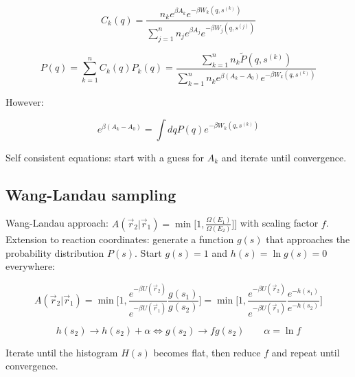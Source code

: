 	$$C_k(q) = \frac{n_ke^{\beta A_k}e^{-\beta W_k(q, s^{(k)})}}{\sum\limits_{j=1}^nn_je^{\beta A_j}e^{-\beta W_j(q, s^{(j)})}}$$

	$$P(q) = \sum\limits_{k=1}^nC_k(q)P_k(q) = \frac{\sum\limits_{k=1}^nn_k\tilde{P}(q, s^{(k)})}{\sum\limits_{k=1}^nn_ke^{\beta(A_k-A_0)}e^{-\beta W_k(q, s^{(k)})}}$$

	However:

	$$e^{\beta(A_k-A_0)} = \int dq P(q)e^{-\beta W_k(q, s^{(k)})}$$

	Self consistent equations: start with a guess for $A_k$ and iterate until convergence.

	\subsection{Wang-Landau sampling}
	Wang-Landau approach: $A(\vec{r}_2|\vec{r}_1) = \min\biggl[1, \frac{\Omega(E_1)}{\Omega(E_2)}]\biggr]$ with scaling factor $f$.
	Extension to reaction coordinates: generate a function $g(s)$ that approaches the probability distribution $P(s)$.
	Start $g(s)=1$ and $h(s) = \ln g(s) = 0$ everywhere:

	$$A(\vec{r}_2|\vec{r}_1) = \min\biggl[1, \frac{e^{-\beta U(\vec{r}_2)}}{e^{-\beta U(\vec{r}_1)}}\frac{g(s_1)}{g(s_2)}\biggr] = \min\biggl[1, \frac{e^{-\beta U(\vec{r}_2)}}{e^{-\beta U(\vec{r}_1)}}\frac{e^{-h(s_1)}}{e^{-h(s_2)}}\biggr]$$

	$$h(s_2) \rightarrow h(s_2) + \alpha \Leftrightarrow g(s_2)\rightarrow fg(s_2)\qquad \alpha = \ln f$$

	Iterate until the histogram $H(s)$ becomes flat, then reduce $f$ and repeat until convergence.
